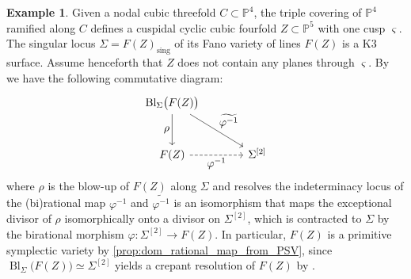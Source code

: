 \documentclass[JEP,XML,SOM,Unicode,published]{cedram}
\let\ts\textstyle
\theoremstyle{plain}
\theoremstyle{definition}
\newtheorem{exa}[thm]{Example}
\renewcommand{\P}{\mathbb{P}}
\DeclareMathOperator{\Bl}{Bl}
\begin{document}
\begin{exa}
\label{example:PEV_from_CCCF}
Given a nodal cubic threefold $C \subset \P^4$, the triple covering of $\P^4$ ramified along $C$ defines a cuspidal cyclic cubic fourfold $Z \subset \P^5$ with one cusp $\varsigma$. The singular locus $\Sigma = F(Z)_\text{sing}$ of its Fano variety of lines $F(Z)$ is a K3 surface.
Assume henceforth that $Z$ does not contain any planes through $\varsigma$. By~\cite[Th.\,4.1(1)(3)]{BHS25} we have the following commutative diagram:
\[
\begin{tikzcd}[row sep = large, column sep = large]
\Bl_{\Sigma}\bigl(F(Z)\bigr) \arrow[d, "\ts \rho" swap] \arrow[rd, "\ts \widetilde{\varphi^{-1}}"]
\\
F(Z) \arrow[r, "\ts \varphi^{-1}" swap, dashed] & {\Sigma^{[2]}}
\end{tikzcd}
\]
where $\rho$ is the blow-up of $F(Z)$ along $\Sigma$ and resolves the indeterminacy locus of the (bi)rational map $\varphi^{-1}$ and $\widetilde{\varphi^{-1}}$ is an isomorphism that maps the exceptional divisor of $\rho$ isomorphically onto a divisor on $\Sigma^{[2]}$,
which is contracted to $\Sigma$ by the birational morphism $\varphi \colon \Sigma^{[2]} \to F(Z)$.
In particular, $F(Z)$ is a primitive symplectic variety by \autoref{prop:dom_rational_map_from_PSV}, since $\Bl_{\Sigma} \bigl(F(Z) \bigr) \simeq \Sigma^{[2]}$ yields a crepant resolution of $F(Z)$ by \cite[Th.\,4.1(2)]{BHS25}.


\end{exa}
\end{document}
